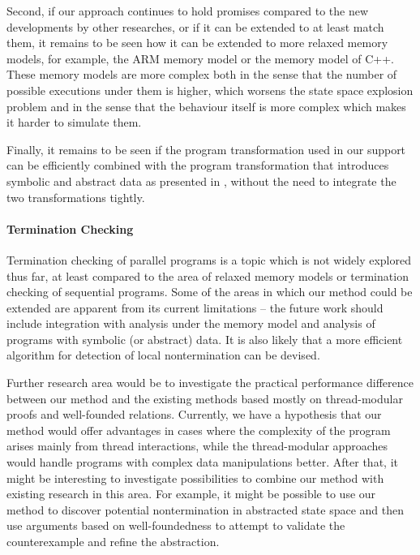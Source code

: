 Second, if our approach continues to hold promises compared to the new developments by other researches, or if it can be extended to at least match them, it remains to be seen how it can be extended to more relaxed memory models, for example, the ARM memory model or the memory model of C++.
These memory models are more complex both in the sense that the number of possible executions under them is higher, which worsens the state space explosion problem and in the sense that the behaviour itself is more complex which makes it harder to simulate them.

Finally, it remains to be seen if the program transformation used in our \xtso support can be efficiently combined with the program transformation that introduces symbolic and abstract data as presented in , without the need to integrate the two transformations tightly.

\paragraph{Termination Checking}

Termination checking of parallel programs is a topic which is not widely explored thus far, at least compared to the area of relaxed memory models or termination checking of sequential programs.
Some of the areas in which our method could be extended are apparent from its current limitations -- the future work should include integration with analysis under the \xtso memory model and analysis of programs with symbolic (or abstract) data.
It is also likely that a more efficient algorithm for detection of local nontermination can be devised.

Further research area would be to investigate the practical performance difference between our method and the existing methods based mostly on thread-modular proofs and well-founded relations.
Currently, we have a hypothesis that our method would offer advantages in cases where the complexity of the program arises mainly from thread interactions, while the thread-modular approaches would handle programs with complex data manipulations better.
After that, it might be interesting to investigate possibilities to combine our method with existing research in this area.
For example, it might be possible to use our method to discover potential nontermination in abstracted state space and then use arguments based on well-foundedness to attempt to validate the counterexample and refine the abstraction.

